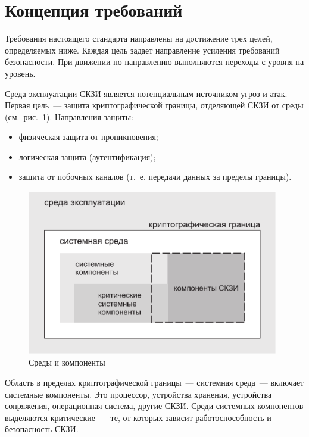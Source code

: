 \section{Концепция требований}\label{COMMON.Concept}

Требования настоящего стандарта направлены на достижение трех целей, 
определяемых ниже. Каждая цель задает направление усиления
требований безопасности. При движении по направлению выполняются переходы с
уровня на уровень.

Среда эксплуатации СКЗИ является потенциальным источником угроз и атак. 
%
%
Первая цель~--- защита криптографической границы, отделяющей СКЗИ от среды
(см.~рис.~\ref{Fig.COMMON.Concept}).
%
Направления защиты:
\begin{itemize}
\item
физическая защита от проникновения;
\item
логическая защита (аутентификация);
\item
защита от побочных каналов (т.~е. передачи данных за пределы границы).
\end{itemize}

\begin{figure}[bht]
\begin{center}
\includegraphics[width=11cm]{../figs/env}
\end{center}
\caption{Среды и компоненты}\label{Fig.COMMON.Concept}
\end{figure}

Область в пределах криптографической границы~--- системная среда~---
включает системные компоненты. Это процессор, устройства хранения, 
устройства сопряжения, операционная система, другие СКЗИ. 
%
Среди системных компонентов выделяются критические~--- те, от которых зависит  
работоспособность и безопасность СКЗИ. 

